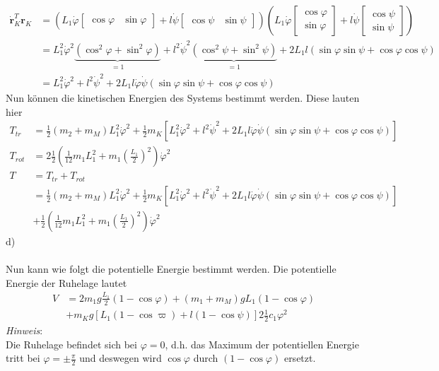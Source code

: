 \begin{align*}
	\dot{\textbf{r}}_K^T\textbf{r}_K &= \left(L_1\dot{\varphi}\left[\begin{matrix}
		\cos\varphi &
		\sin\varphi
		\end{matrix}\right]
	+
	l\dot{\psi}\left[\begin{matrix}
	\cos\psi &
	\sin\psi
	\end{matrix}\right]\right)
	\left(L_1\dot{\varphi}\left[\begin{matrix}
		\cos\varphi \\
		\sin\varphi
		\end{matrix}\right]
	+
	l\dot{\psi}\left[\begin{matrix}
	\cos\psi\\
	\sin\psi
	\end{matrix}\right]\right) \\
	&= L_1^2\dot{\varphi}^2\underbrace{\left(\cos^2\varphi + \sin^2\varphi\right)}_{=1} + l^2\dot{\psi}^2\underbrace{\left( \cos^2\psi + \sin^2\psi\right)}_{=1} + 2L_1l\left(\sin\varphi\sin\psi + \cos\varphi\cos\psi\right) \\
	&= L_1^2\dot{\varphi}^2 + l^2\dot{\psi}^2 + 2L_1l\dot{\varphi}\dot{\psi}\left(\sin\varphi\sin\psi + \cos\varphi\cos\psi\right)
\end{align*}
\newpage
Nun können die kinetischen Energien des Systems bestimmt werden. Diese lauten hier
\begin{align*}
	T_{tr} &= \frac{1}{2} \left(m_2 + m_M\right) L_1^2\dot{\varphi}^2 + \frac{1}{2} m_K \left[ L_1^2\dot{\varphi}^2 + l^2\dot{\psi}^2 + 2L_1l\dot{\varphi}\dot{\psi}\left(\sin\varphi\sin\psi + \cos\varphi\cos\psi\right)\right] \\
	T_{rot} &= 2 \frac{1}{2} \left(\frac{1}{12}m_1L_1^2 + m_1\left(\frac{L_1}{2}\right)^2\right)\dot{\varphi}^2 \\
	T &= T_{tr} + T_{rot} \\
	  &= \frac{1}{2} \left(m_2 + m_M\right) L_1^2\dot{\varphi}^2 + \frac{1}{2} m_K \left[ L_1^2\dot{\varphi}^2 + l^2\dot{\psi}^2 + 2L_1l\dot{\varphi}\dot{\psi}\left(\sin\varphi\sin\psi + \cos\varphi\cos\psi\right)\right] \\
	  &+ \frac{1}{2} \left(\frac{1}{12}m_1L_1^2 + m_1\left(\frac{L_1}{2}\right)^2\right)\dot{\varphi}^2
\end{align*}
d) \\ \\
Nun kann wie folgt die potentielle Energie bestimmt werden. Die potentielle Energie der Ruhelage lautet
\begin{align*}
	V &= 2m_1g\frac{L_1}{2}\left(1-\cos\varphi\right) + \left(m_1 + m_M\right)gL_1 \left(1 - \cos\varphi\right) \\
	&+ m_Kg\left[L_1\left(1-\cos\varpi\right) +l\left(1 - \cos\psi\right)\right] 2 \frac{1}{2}c_1\varphi^2
\end{align*}
\textit{Hinweis}: \\
Die Ruhelage befindet sich bei \(\varphi = 0\), d.h. das Maximum der potentiellen Energie tritt bei \(\varphi = \pm \frac{\pi}{2}\) und deswegen wird \(\cos\varphi\) durch \(\left(1-\cos\varphi\right)\) ersetzt.